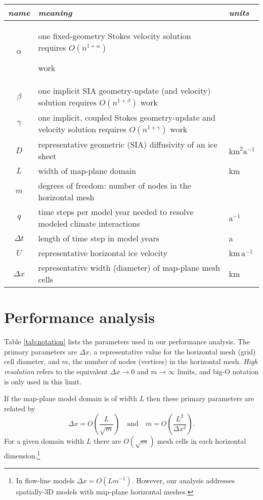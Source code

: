 \documentclass[twocolumn,letterpaper]{igs}
\begin{document}
\begin{table*}[ht]
{\normalsize
\begin{tabular}{cll}
\emph{name} & \emph{meaning} & \emph{units} \\ \hline
$\alpha$    & one fixed-geometry Stokes velocity solution requires $O(n^{1+\alpha})${\large \strut} work\\
$\beta$     & one implicit SIA geometry-update (and velocity) solution requires $O(n^{1+\beta})$ work \\
$\gamma$    & one implicit, coupled Stokes geometry-update and velocity solution requires $O(n^{1+\gamma})$ work \\
$D$         & representative geometric (SIA) diffusivity of an ice sheet & $\text{km}^2 \text{a}^{-1}$ \\
$L$         & width of map-plane domain & km \\
$m$         & degrees of freedom: number of nodes in the horizontal mesh \\
$q$         & time steps per model year needed to resolve modeled climate interactions & $\text{a}^{-1}$ \\
$\Delta t$  & length of time step in model years & a \\
$U$         & representative horizontal ice velocity & $\text{km}\,\text{a}^{-1}$ \\
$\Delta x$  & representative width (diameter) of map-plane mesh cells & km
\end{tabular}
}
\caption{Parameters for performance analysis.  Note $\alpha$, $\beta$, $\gamma$, and $m$ are pure numbers.}
\label{tab:notation}
\end{table*}


\section{Performance analysis}

Table \ref{tab:notation} lists the parameters used in our performance analysis.  The primary parameters are $\Delta x$, a representative value for the horizontal mesh (grid) cell diameter, and $m$, the number of nodes (vertices) in the horizontal mesh.  \emph{High resolution} refers to the equivalent $\Delta x\to 0$ and $m\to\infty$ limits, and big-O notation is only used in this limit.

If the map-plane model domain is of width $L$ then these primary parameters are related by
\begin{equation}
\Delta x = O\left(\frac{L}{\sqrt{m}}\right) \quad \text{and} \quad m = O\left(\frac{L^2}{\Delta x^2}\right).  \label{eq:paramrelation}
\end{equation}
For a given domain width $L$ there are $O(\sqrt{m})$ mesh cells in each horizontal dimension.\footnote{In flow-line models $\Delta x = O(L m^{-1})$.  However, our analysis addresses spatially-3D models with map-plane horizontal meshes.}
\end{document}
